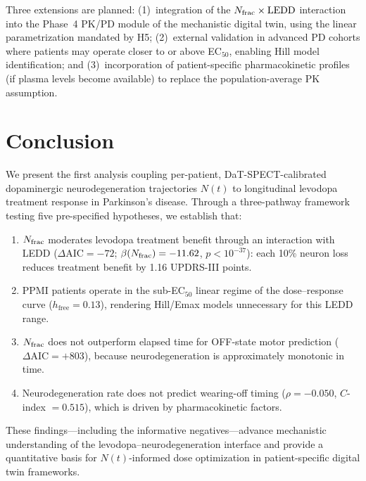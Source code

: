 Three extensions are planned: (1)~integration of the $N_{\mathrm{frac}} \times \mathrm{LEDD}$
interaction into the Phase~4 PK/PD module of the mechanistic digital
twin, using the linear parametrization mandated by H5; (2)~external
validation in advanced PD cohorts where patients may operate closer to
or above EC$_{50}$, enabling Hill model identification; and
(3)~incorporation of patient-specific pharmacokinetic profiles (if plasma
levels become available) to replace the population-average PK assumption.


\section{Conclusion}

We present the first analysis coupling per-patient, DaT-SPECT-calibrated
dopaminergic neurodegeneration trajectories $N(t)$ to longitudinal
levodopa treatment response in Parkinson's disease. Through a
three-pathway framework testing five pre-specified hypotheses, we
establish that:

\begin{enumerate}
  \item $N_{\mathrm{frac}}$ moderates levodopa treatment benefit through an
    interaction with LEDD ($\Delta\text{AIC} = -72$; $\beta(N_{\mathrm{frac}})
    = -11.62$, $p < 10^{-37}$): each 10\% neuron loss reduces
    treatment benefit by 1.16 UPDRS-III points.

  \item PPMI patients operate in the sub-EC$_{50}$ linear regime
    of the dose--response curve ($h_\text{free} = 0.13$), rendering
    Hill/Emax models unnecessary for this LEDD range.

  \item $N_{\mathrm{frac}}$ does not outperform elapsed time for OFF-state motor
    prediction ($\Delta\text{AIC} = +803$), because neurodegeneration
    is approximately monotonic in time.

  \item Neurodegeneration rate does not predict wearing-off timing
    ($\rho = -0.050$, $C$-index $= 0.515$), which is driven by
    pharmacokinetic factors.
\end{enumerate}

These findings---including the informative negatives---advance
mechanistic understanding of the levodopa--neurodegeneration interface
and provide a quantitative basis for $N(t)$-informed dose optimization
in patient-specific digital twin frameworks.


